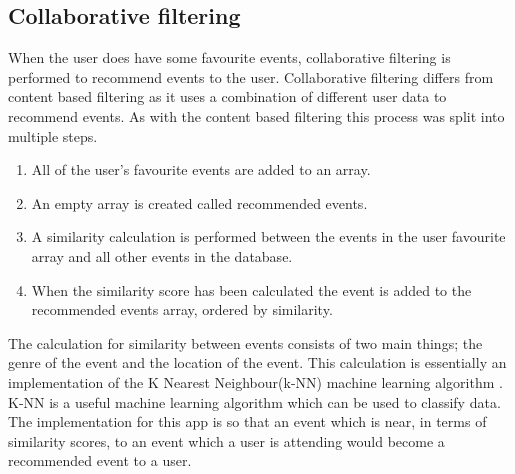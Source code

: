 \subsection{Collaborative filtering}
When the user does have some favourite events, collaborative filtering is performed to recommend events to the user. Collaborative filtering differs from content based filtering as it uses a combination of different user data to recommend events. As with the content based filtering this process was split into multiple steps.
\begin{enumerate} 
  \item All of the user's favourite events are added to an array.
  \item An empty array is created called recommended events.
  \item A similarity calculation is performed between the events in the user favourite array and all other events in the database.
  \item When the similarity score has been calculated the event is added to the recommended events array, ordered by similarity. 
\end{enumerate}
The calculation for similarity between events consists of two main things; the genre of the event and the location of the event. This calculation is essentially an implementation of the K Nearest Neighbour(k-NN) machine learning algorithm \cite{knn} \cite{knn2}. K-NN is a useful machine learning algorithm which can be used to classify data. The implementation for this app is so that an event which is near, in terms of similarity scores, to an event which a user is attending would become a recommended event to a user.

